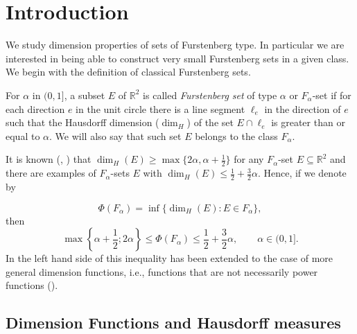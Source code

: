 \documentclass[11pt,a4paper]{amsart}
\begin{document}
\maketitle

\section{Introduction}\label{sec:intro}
We study dimension properties of sets of Furstenberg type. In
particular we are interested in being able to construct very small
Furstenberg sets in a given class. We begin with
the definition of classical Furstenberg sets. 

\begin{definition}
For $\alpha$ in $(0,1]$, a subset $E$ of ${\mathbb{R}^{2}}$ is called
\textit{Furstenberg set} of type $\alpha$ or $F_\alpha$-set if
for each direction $e$ in the unit circle there is a line segment
$\ell_e$ in the direction of $e$ such that the Hausdorff
dimension ($\dim_H$) of the set $E\cap\ell_e$ is greater than or equal to
$\alpha$. We will also say that such set $E$ belongs to the class
$F_\alpha$.
\end{definition}

It is known (\cite{wol99b}, \cite{kt01}) that $\dim_H(E)\ge\max\{2\alpha,\alpha+\frac{1}{2}\}$
for any $F_\alpha$-set $E\subseteq {\mathbb{R}^{2}}$ and there are examples of
$F_\alpha$-sets $E$ with $\dim_H(E)\le
\frac{1}{2}+\frac{3}{2}\alpha$. Hence, if we denote by

\begin{equation*}
  \Phi(F_\alpha)=\inf \{\dim_H(E): E\in F_\alpha\},
\end{equation*}
then
\begin{equation}
\label{eq:dim}\max\left\{\alpha+\frac{1}{2} ; 2\alpha\right\}\le
\Phi(F_\alpha)\le\frac{1}{2}+\frac{3}{2}\alpha,\qquad
\alpha\in(0,1].
\end{equation}
In \cite{mr10} the left hand side of this inequality has been extended to the case of more general
dimension functions, i.e., functions that are not necessarily power functions
(\cite{Hau18}).

\subsection{Dimension Functions and Hausdorff measures}
\end{document}
